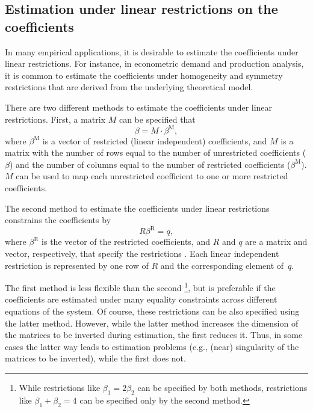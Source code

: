 \subsection{Estimation under linear restrictions on the coefficients}
\label{sec:Restrictions}

In many empirical applications,
it is desirable to estimate the coefficients under linear restrictions.
For instance, in econometric demand and production analysis,
it is common to estimate the coefficients
under homogeneity and symmetry restrictions
that are derived from the underlying theoretical model.

There are two different methods to estimate the coefficients
under linear restrictions.
First, a matrix $M$ can be specified that
\begin{equation}
   \beta = M \cdot \beta^\text{M} \label{eq:T-restr} ,
\end{equation}
where $\beta^\text{M}$ is a vector of restricted (linear independent) coefficients,
and $M$ is a matrix with the number of rows equal to the number of
unrestricted coefficients ($\beta$) and
the number of columns equal to the number of restricted coefficients
($\beta^\text{M}$).
$M$ can be used to map each unrestricted coefficient to one or more
restricted coefficients.

The second method to estimate the coefficients under linear restrictions
constrains the coefficients by
\begin{equation}
   R \beta^\text{R} = q ,
   \label{eq:restr-R}
\end{equation}
where $\beta^\text{R}$ is the vector of the restricted coefficients,
and $R$ and $q$ are a matrix and vector, respectively,
that specify the restrictions \citep[see][p.~100]{greene03}.
Each linear independent restriction is represented by one row of $R$
and the corresponding element of~$q$.

The first method is less flexible than the second%
\footnote{
While restrictions like $\beta_1 = 2 \beta_2$ can be specified by
both methods,
restrictions like $\beta_1 + \beta_2 = 4$ can be specified only
by the second method.
}, 
but is preferable if the coefficients are estimated
under many equality constraints across different equations of the system.
Of course, these restrictions can be also specified using
the latter method.
However, while the latter method increases the dimension of the 
matrices to be inverted during estimation, the first reduces it. 
Thus, in some cases the latter way leads to estimation problems
(e.g., (near) singularity of the matrices to be inverted),
while the first does not.

